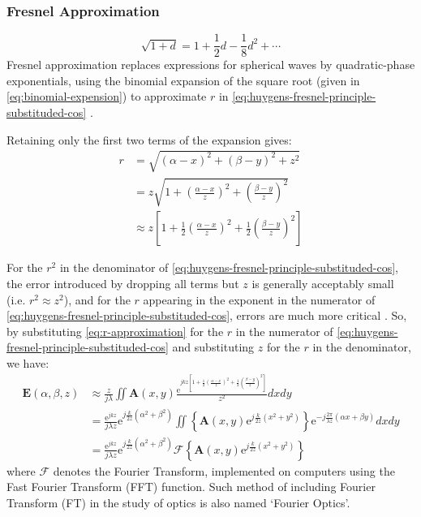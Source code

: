 \subsubsection{Fresnel Approximation}
\begin{equation}
  \sqrt{1+d} = 1 + \frac{1}{2}d - \frac{1}{8}d^2 + \cdots \label{eq:binomial-expension}
\end{equation}
Fresnel approximation replaces expressions for spherical waves by quadratic-phase exponentials, using the binomial expansion of the square root (given in \cref{eq:binomial-expension}) to approximate $r$ in \cref{eq:huygens-fresnel-principle-substituded-cos} \cite{Goodman2017}.

Retaining only the first two terms of the expansion gives:
\begin{align}
  r & = \sqrt{(\alpha-x)^2 + (\beta-y)^2 + z^2}                                                                                                              \\
    & = z \sqrt{1 + \left( \frac{\alpha-x}{z} \right)^2 + \left(\frac{\beta-y}{z}\right)^2}                                                                  \\
    & \approx z \left[ 1 + \frac{1}{2} \left( \frac{\alpha-x}{z} \right)^2 + \frac{1}{2} \left(\frac{\beta-y}{z}\right)^2 \right] \label{eq:r-approximation}
\end{align}

For the $r^2$ in the denominator of \cref{eq:huygens-fresnel-principle-substituded-cos}, the error introduced by dropping all terms but $z$ is generally acceptably small (i.e. $r^2\approx z^2$), and for the $r$ appearing in the exponent in the numerator of \cref{eq:huygens-fresnel-principle-substituded-cos}, errors are much more critical \cite{Goodman2017}. So, by substituting \cref{eq:r-approximation} for the $r$ in the numerator of \cref{eq:huygens-fresnel-principle-substituded-cos} and substituting $z$ for the $r$ in the denominator, we have:
\begin{align}
  \textbf{E}(\alpha, \beta, z) & \approx \frac{z}{j\lambda} \iint \textbf{A}(x,y)\frac{\mathrm{e}^{jkz \left[ 1 + \frac{1}{2} \left( \frac{\alpha-x}{z} \right)^2 + \frac{1}{2} \left(\frac{\beta-y}{z}\right)^2 \right]}}{z^2} dxdy \\
                      & = \frac{\mathrm{e}^{jkz}}{j\lambda z} \mathrm{e}^{j\frac{k}{2z}(\alpha^2+\beta^2)} \iint \left\{\textbf{A}(x,y)\mathrm{e}^{j\frac{k}{2z}(x^2+y^2)}\right\}\mathrm{e}^{-j\frac{2\pi}{\lambda z}(\alpha x+\beta y)}dxdy    \\
                      & = \frac{\mathrm{e}^{jkz}}{j\lambda z} \mathrm{e}^{j\frac{k}{2z}(\alpha^2+\beta^2)} \mathcal{F} \left\{\textbf{A}(x,y)\mathrm{e}^{j\frac{k}{2z}(x^2+y^2)}\right\}
\end{align}
where $\mathcal{F}$ denotes the Fourier Transform, implemented on computers using the Fast Fourier Transform (FFT) function. Such method of including Fourier Transform (FT) in the study of optics is also named `Fourier Optics'.

